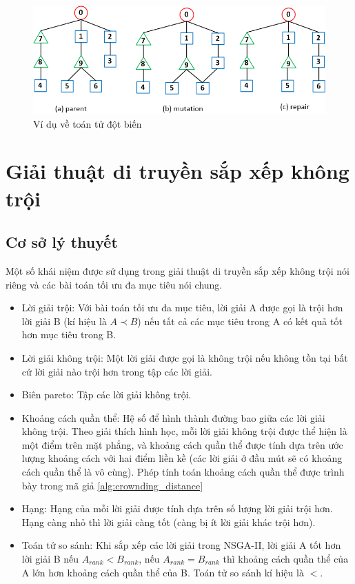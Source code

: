 \documentclass{hust}
\begin{document}
\begin{figure}[hpt]
	\centering
	\includegraphics[scale=1.0]{images/mutation}
	\caption{Ví dụ về toán tử đột biến}\label{fig:mutation}
\end{figure}

\section{Giải thuật di truyền sắp xếp không trội}
\subsection{Cơ sở lý thuyết}
Một số khái niệm được sử dụng trong giải thuật di truyền sắp xếp không trội nói riêng và các bài toán tối ưu đa mục tiêu nói chung.
\begin{itemize}
	\item Lời giải trội: Với bài toán tối ưu đa mục tiêu, lời giải A được gọi là trội hơn lời giải B (kí hiệu là $A \prec B$) nếu tất cả các mục tiêu trong A có kết quả tốt hơn mục tiêu trong B.
	\item Lời giải không trội: Một lời giải được gọi là không trội nếu không tồn tại bất cứ lời giải nào trội hơn trong tập các lời giải.
	\item Biên pareto: Tập các lời giải không trội.
	\item Khoảng cách quần thể: Hệ số để hình thành đường bao giữa các lời giải không trội. Theo giải thích hình học, mỗi lời giải không trội được thể hiện là một điểm trên mặt phẳng, và khoảng cách quần thể được tính dựa trên ước lượng khoảng cách với hai điểm liền kề (các lời giải ở đầu mút sẽ có khoảng cách quần thể là vô cùng). Phép tính toán khoảng cách quần thể được trình bày trong mã giả \ref{alg:crownding_distance}
	\item Hạng: Hạng của mỗi lời giải được tính dựa trên số lượng lời giải trội hơn. Hạng càng nhỏ thì lời giải càng tốt (càng bị ít lời giải khác trội hơn).
	\item Toán tử so sánh: Khi sắp xếp các lời giải trong \gls{NSGA-II}, lời giải A tốt hơn lời giải B nếu $A_{rank} < B_{rank}$, nếu $A_{rank} = B_{rank}$ thì khoảng cách quần thể của A lớn hơn khoảng cách quần thể của B. Toán tử so sánh kí hiệu là $<$.
\end{itemize}
\end{document}
